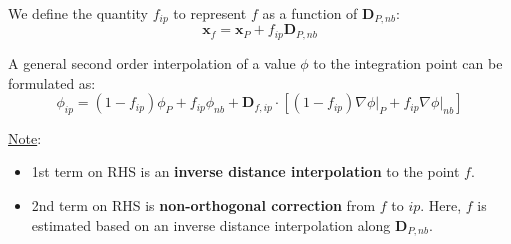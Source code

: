 \documentclass[11pt]{article}
\begin{document}
We define the quantity \(f_{ip}\) to represent \(f\) as a function of \(\textbf{D}_{P,nb}\):
\begin{equation*}
\textbf{x}_f = \textbf{x}_P + f_{ip}\textbf{D}_{P,nb}
\end{equation*}

A general second order interpolation of a value \(\phi\) to the integration point can be formulated as:
\begin{equation*}
\phi_{ip} = (1-f_{ip})\phi_P + f_{ip}\phi_{nb} + \textbf{D}_{f,ip} \cdot \left[
(1-f_{ip})\nabla \phi \biggr\rvert_P + f_{ip}\nabla \phi \biggr\rvert_{nb}\right]
\end{equation*}

\uline{Note}:
\begin{itemize}
\item 1st term on RHS is an \textbf{inverse distance interpolation} to the point \(f\).
\item 2nd term on RHS is \textbf{non-orthogonal correction} from \(f\) to \(ip\). Here, \(f\) is estimated
based on an inverse distance interpolation along \(\textbf{D}_{P,nb}\).
\end{itemize}
\end{document}
